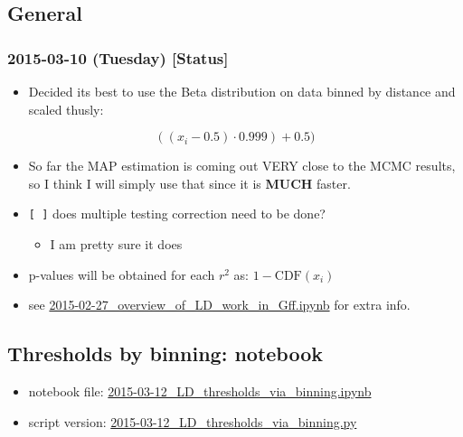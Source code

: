 \documentclass[letterpaper]{scrartcl}
\begin{document}
\subsection{General}\label{general}

\subsubsection{2015-03-10 (Tuesday) {[}Status{]}}\label{tuesday-status}

\begin{itemize}
\itemsep1pt\parskip0pt
\item
  Decided its best to use the Beta distribution on data binned by
  distance and scaled thusly:
\end{itemize}

\[((x_i-0.5) \cdot 0.999) + 0.5)\]

\begin{itemize}
\itemsep1pt\parskip0pt
\item
  So far the MAP estimation is coming out VERY close to the MCMC
  results, so I think I will simply use that since it is \textbf{MUCH}
  faster.
\item
  \texttt{{[} {]}} does multiple testing correction need to be done?

  \begin{itemize}
  \itemsep1pt\parskip0pt
  \item
    I am pretty sure it does
  \end{itemize}
\item
  p-values will be obtained for each \(r^2\) as:
  \(1 - \mathrm{CDF}(x_i)\)
\item
  see
  \href{http://nbviewer.ipython.org/github/xguse/ipy_notebooks/blob/master/YALE/ddrad58/2015-02-27_overview_of_LD_work_in_Gff.ipynb}{2015-02-27\_overview\_of\_LD\_work\_in\_Gff.ipynb}
  for extra info.
\end{itemize}

\subsection{Thresholds by binning:
notebook}\label{thresholds-by-binning-notebook}

\begin{itemize}
\itemsep1pt\parskip0pt
\item
  notebook file:
  \href{file:///home/gus/Dropbox/repos/git/ipy_notebooks/YALE/ddrad58/2015-03-12_LD_thresholds_via_binning.ipynb}{2015-03-12\_LD\_thresholds\_via\_binning.ipynb}
\item
  script version:
  \href{file:///home/gus/Dropbox/repos/git/ipy_notebooks/YALE/ddrad58/2015-03-12_LD_thresholds_via_binning.py}{2015-03-12\_LD\_thresholds\_via\_binning.py}
\end{itemize}
\end{document}
